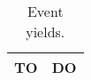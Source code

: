 \begin{table}[!h]
\begin{center}
\begin{tabular}{|c|c|}

\hline
TO & DO \\
\hline

\end{tabular}
\end{center}
\caption{
  Event yields.
}
\label{tab:event_yields}
\end{table}

